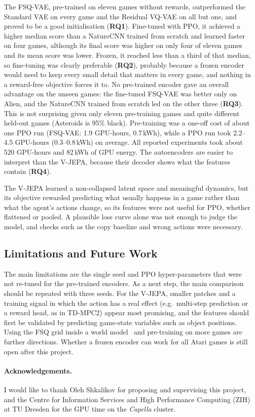 \documentclass[runningheads,a4paper]{llncs}
\begin{document}
The FSQ-VAE, pre-trained on eleven games without rewards, outperformed the Standard VAE on every
game and the Residual VQ-VAE on all but one, and proved to be a good initialisation
(\textbf{RQ1}). Fine-tuned with PPO, it achieved a higher median score than a NatureCNN trained
from scratch and learned faster on four games, although its final score was higher on only
four of eleven games and its mean score was lower. Frozen, it reached less than a third of that
median, so fine-tuning was clearly preferable (\textbf{RQ2}), probably because a frozen encoder
would need to keep every small detail that matters in every game, and nothing in a reward-free
objective forces it to. No pre-trained encoder gave an overall advantage on the unseen games: the
fine-tuned FSQ-VAE was better only on Alien, and the NatureCNN trained from scratch led on the
other three (\textbf{RQ3}). This is not surprising given only eleven pre-training games and
quite different held-out games (Asteroids is 95\% black). Pre-training was a one-off cost of
about one PPO run (FSQ-VAE: 1.9 GPU-hours, 0.7\,kWh), while a PPO run took 2.2--4.5
GPU-hours (0.3--0.8\,kWh) on average. All reported experiments took about 520 GPU-hours and 82\,kWh of GPU
energy. The autoencoders are easier to interpret than the V-JEPA, because their decoder shows
what the features contain (\textbf{RQ4}).

The V-JEPA learned a non-collapsed latent space and meaningful dynamics, but its objective
rewarded predicting what usually happens in a game rather than what the agent's actions change,
so its features were not useful for PPO, whether flattened or pooled. A plausible loss curve alone was not enough to judge the model, and checks such as the copy
baseline and wrong actions were necessary.

\subsection{Limitations and Future Work}
\label{sec:limitations}

The main limitations are the single seed and PPO hyper-parameters that were not re-tuned for
the pre-trained encoders. As a next step, the main comparison should be repeated with three seeds.
For the V-JEPA, smaller patches and a training signal in which the
action has a real effect (e.g.\ multi-step prediction or a reward head, as in TD-MPC2) appear
most promising, and the features should first be validated by predicting game-state variables
such as object positions. Using the FSQ grid inside a world
model~\cite{hafner2021dreamerv2,micheli2023iris} and pre-training on more games are further
directions. Whether a frozen encoder can work for all Atari games is still open after this
project.

\paragraph{Acknowledgements.}
I would like to thank Oleh Shkalikov for proposing and supervising this project, and the
Centre for Information Services and High Performance Computing (ZIH) at TU Dresden for the GPU
time on the \emph{Capella} cluster.



\end{document}
